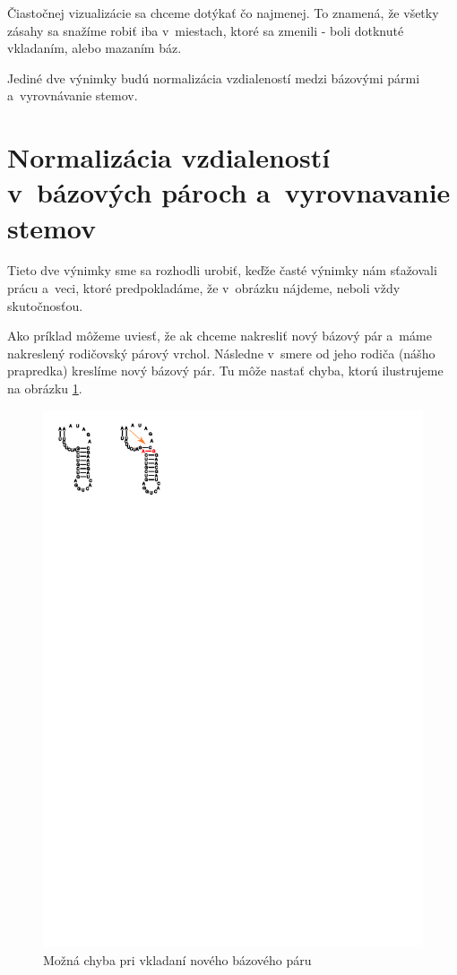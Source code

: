 Čiastočnej vizualizácie sa chceme dotýkať čo najmenej. To znamená, že všetky zásahy sa
snažíme robiť iba v~miestach, ktoré sa zmenili - boli dotknuté vkladaním, alebo mazaním báz.

Jediné dve výnimky budú normalizácia vzdialeností medzi bázovými pármi a~vyrovnávanie stemov.





\section{Normalizácia vzdialeností v~bázových pároch a~vyrovnavanie stemov}

Tieto dve výnimky sme sa rozhodli urobiť, keďže časté výnimky nám sťažovali
prácu a~veci, ktoré predpokladáme, že v~obrázku nájdeme, neboli vždy skutočnosťou.

Ako príklad môžeme uviesť, že ak chceme nakresliť nový bázový pár a~máme nakreslený
rodičovský párový vrchol. Následne v~smere od jeho rodiča (nášho prapredka) kreslíme nový
bázový pár. Tu môže nastať chyba, ktorú ilustrujeme na obrázku \ref{obr:insert_stem_error}.

\begin{figure}[H]
  \centering
  \includegraphics[clip, trim=0 24.5cm 14cm 0]{../img/alg/even_stem/error_insert}
  \caption{Možná chyba pri vkladaní nového bázového páru}
  \label{obr:insert_stem_error}
\end{figure}

